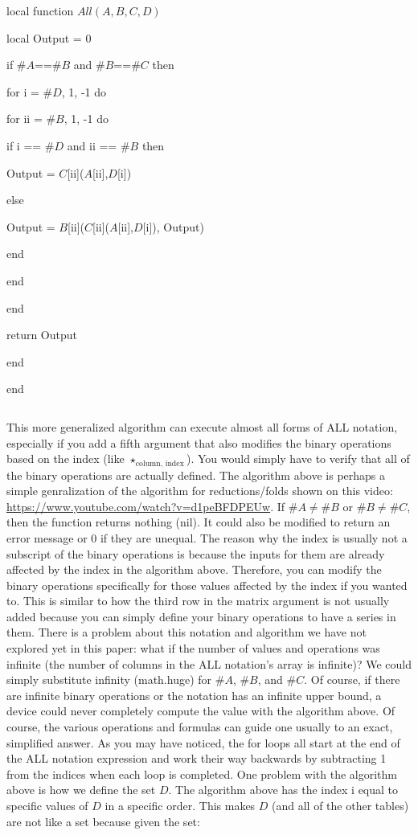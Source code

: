 \documentclass{article}
\begin{document}
$${}$$

local function $All(A, B, C, D)$

local Output = 0

if $\#A$==$\#B$ and $\#B$==$\#C$ then

for i = $\#D$, 1, -1 do

for ii = $\#B$, 1, -1 do

if i == $\#D$ and ii == $\#B$ then

Output = $C$[ii]($A$[ii],$D$[i])

else

Output = $B$[ii]($C$[ii]($A$[ii],$D$[i]), Output)

end

end

end

return Output

end

end

$${}$$


This more generalized algorithm can execute almost all forms of ALL notation, especially if you add a fifth argument that also modifies the binary operations based on the index (like $\star_{\text{column, index}}$). You would simply have to verify that all of the binary operations are actually defined. The algorithm above is perhaps a simple genralization of the algorithm for reductions/folds shown on this video: \url{https://www.youtube.com/watch?v=d1peBFDPEUw}. If $\#A \neq \#B$ or $\#B \neq \#C$, then the function returns nothing (nil). It could also be modified to return an error message or 0 if they are unequal. The reason why the index is usually not a subscript of the binary operations is because the inputs for them are already affected by the index in the algorithm above. Therefore, you can modify the binary operations specifically for those values affected by the index if you wanted to. This is similar to how the third row in the matrix argument is not usually added because you can simply define your binary operations to have a series in them. There is a problem about this notation and algorithm we have not explored yet in this paper: what if the number of values and operations was infinite (the number of columns in the ALL notation’s array is infinite)? We could simply substitute infinity (math.huge) for $\#A$, $\#B$, and $\#C$. Of course, if there are infinite binary operations or the notation has an infinite upper bound, a device could never completely compute the value with the algorithm above. Of course, the various operations and formulas can guide one usually to an exact, simplified answer. As you may have noticed, the for loops all start at the end of the ALL notation expression and work their way backwards by subtracting 1 from the indices when each loop is completed. One problem with the algorithm above is how we define the set $D$. The algorithm above has the index i equal to specific values of $D$ in a specific order. This makes $D$ (and all of the other tables) are not like a set because given the set:
\end{document}

